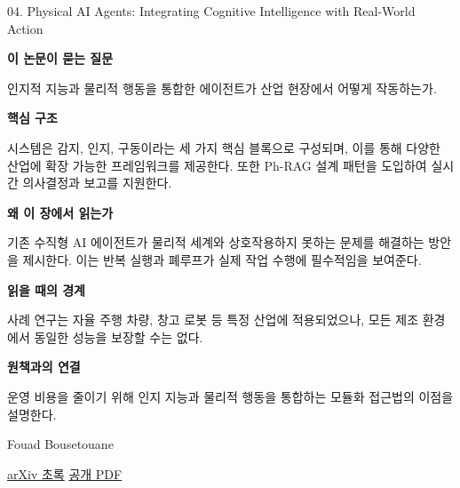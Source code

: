 \documentclass[11pt,openany]{book}
\begin{document}
\begin{termcard}{04. Physical AI Agents: Integrating Cognitive Intelligence with Real-World Action}

\par

\medskip

{\sffamily\bfseries\color{deepblue} 이 논문이 묻는 질문}\par

인지적 지능과 물리적 행동을 통합한 에이전트가 산업 현장에서 어떻게 작동하는가.

\smallskip

{\sffamily\bfseries\color{deepblue} 핵심 구조}\par

시스템은 감지, 인지, 구동이라는 세 가지 핵심 블록으로 구성되며, 이를 통해 다양한 산업에 확장 가능한 프레임워크를 제공한다. 또한 Ph-RAG 설계 패턴을 도입하여 실시간 의사결정과 보고를 지원한다.

\smallskip

{\sffamily\bfseries\color{deepblue} 왜 이 장에서 읽는가}\par

기존 수직형 AI 에이전트가 물리적 세계와 상호작용하지 못하는 문제를 해결하는 방안을 제시한다. 이는 반복 실행과 폐루프가 실제 작업 수행에 필수적임을 보여준다.

\smallskip

{\sffamily\bfseries\color{coral} 읽을 때의 경계}\par

사례 연구는 자율 주행 차량, 창고 로봇 등 특정 산업에 적용되었으나, 모든 제조 환경에서 동일한 성능을 보장할 수는 없다.

\smallskip

{\sffamily\bfseries\color{teal} 원책과의 연결}\par

운영 비용을 줄이기 위해 인지 지능과 물리적 행동을 통합하는 모듈화 접근법의 이점을 설명한다.

\medskip

{\footnotesize\color{muted} Fouad Bousetouane\par

\href{https://arxiv.org/abs/2501.08944}{arXiv 초록} \quad \href{https://arxiv.org/pdf/2501.08944}{공개 PDF}\par}

\end{termcard}
\end{document}
